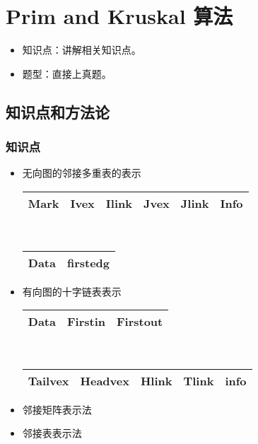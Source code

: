\chapter{Prim and Kruskal 算法}
\label{chap5}
\begin{itemize}[noitemsep,topsep=0pt,parsep=0pt,partopsep=0pt]
	\item 知识点：讲解相关知识点。
	\item 题型：直接上真题。
\end{itemize}
\section{知识点和方法论}


\subsection{知识点}

\begin{itemize}[noitemsep,topsep=0pt,parsep=0pt,partopsep=0pt]
	\item 无向图的邻接多重表的表示
	~\\
	\begin{center}
	\begin{tabular}{|c|c|c|c|c|c|}%
		\hline  %
			Mark & Ivex & Ilink	& Jvex & Jlink & Info \\
		\hline  %
	\end{tabular}
	\end{center}
	~\\
	\begin{center}
	\begin{tabular}{|c|c|}%
		\hline  %
		 Data & firstedg \\
		\hline  %
	\end{tabular}
	\end{center}

	\item 有向图的十字链表表示
	~\\
	\begin{center}
	\begin{tabular}{|c|c|c|}%
		\hline  %
			Data & Firstin & Firstout\\
		\hline  %
	\end{tabular}
	\end{center}
	~\\
	\begin{center}
	\begin{tabular}{|c|c|c|c|c|}%
		\hline  %
		 Tailvex & Headvex & Hlink & Tlink & info \\
		\hline  %
	\end{tabular}
	\end{center}
	\item 邻接矩阵表示法
	\item 邻接表表示法
\end{itemize}
